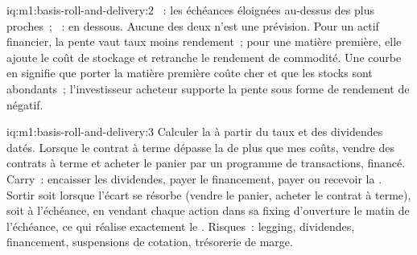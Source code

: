 \begin{solution}{iq:m1:basis-roll-and-delivery:2}
~: les échéances éloignées au-dessus des plus proches~; ~: en dessous.
Aucune des deux n'est une prévision. Pour un actif financier, la pente vaut taux moins rendement~;
pour une matière première, elle ajoute le coût de stockage et retranche le rendement de commodité.
Une courbe en  signifie que porter la matière première coûte cher et que les stocks sont abondants~;
l'investisseur acheteur supporte la pente sous forme de rendement de  négatif.
\end{solution}

\begin{solution}{iq:m1:basis-roll-and-delivery:3}
Calculer la  à partir du taux et des dividendes datés. Lorsque le contrat à terme
dépasse la  de plus que mes coûts, vendre des contrats à terme et acheter le panier
par un programme de transactions, financé. Carry~: encaisser les dividendes, payer le
financement, payer ou recevoir la . Sortir soit lorsque l'écart se résorbe
(vendre le panier, acheter le contrat à terme), soit à l'échéance, en vendant chaque action
dans sa fixing d'ouverture le matin de l'échéance, ce qui réalise exactement le . Risques~: legging, dividendes, financement, suspensions de cotation, trésorerie de marge.
\end{solution}

